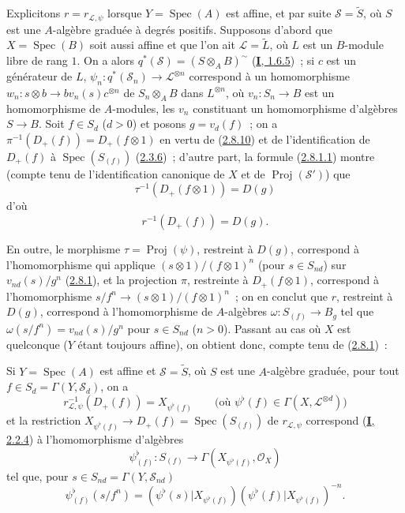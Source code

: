 \begin{env}[3.7.2]
\label{II.3.7.2-fr}
Explicitons $r=r_{\mathcal{L},\psi}$ lorsque $Y=\operatorname{Spec}(A)$ est
affine, et par suite $\mathcal{S}=\widetilde{S}$, où $S$ est une $A$-algèbre
graduée à degrés positifs. Supposons d'abord que $X=\operatorname{Spec}(B)$
soit aussi affine et que l'on ait $\mathcal{L}=\widetilde{L}$, où $L$ est un
$B$-module libre de rang $1$. On a alors
$q^*(\mathcal{S})=(S\otimes_AB)^{\sim}$
(\hyperref[I.1.6.5-fr]{\textbf{I}, 1.6.5})~; si $c$ est un générateur de $L$,
$\psi_n:q^*(\mathcal{S}_n)\to\mathcal{L}^{\otimes n}$ correspond à un
homomorphisme
$w_n:s\otimes b\to bv_n(s)c^{\otimes n}$ de $S_n\otimes_AB$ dans
$L^{\otimes n}$, où $v_n:S_n\to B$ est un homomorphisme de $A$-modules, les
$v_n$ constituant un homomorphisme d'algèbres $S\to B$. Soit $f\in S_d$
($d>0$) et posons $g=v_d(f)$~; on a
$\pi^{-1}(D_+(f))=D_+(f\otimes1)$ en vertu de
(\hyperref[II.2.8.10-fr]{2.8.10}) et de l'identification de $D_+(f)$ à
$\operatorname{Spec}(S_{(f)})$ (\hyperref[II.2.3.6-fr]{2.3.6})~; d'autre
part, la formule (\hyperref[II.2.8.1.1-fr]{2.8.1.1}) montre (compte tenu de
l'identification canonique de $X$ et de $\operatorname{Proj}(\mathcal{S}')$)
que
\[
  \tau^{-1}(D_+(f\otimes1))=D(g)
\]
d'où
\[
\label{II.3.7.2.1-fr}
  r^{-1}(D_+(f))=D(g).
\tag{3.7.2.1}
\]

En outre, le morphisme $\tau=\operatorname{Proj}(\psi)$, restreint à $D(g)$,
correspond à l'homomorphisme qui applique
$(s\otimes1)/(f\otimes1)^n$ (pour $s\in S_{nd}$) sur
$v_{nd}(s)/g^n$ (\hyperref[II.2.8.1-fr]{2.8.1}), et la projection $\pi$,
restreinte à $D_+(f\otimes1)$, correspond à l'homomorphisme
$s/f^n\to(s\otimes1)/(f\otimes1)^n$~; on en conclut que $r$, restreint à
$D(g)$, correspond à l'homomorphisme de $A$-algèbres
$\omega:S_{(f)}\to B_g$ tel que $\omega(s/f^n)=v_{nd}(s)/g^n$ pour
$s\in S_{nd}$ ($n>0$). Passant au cas où $X$ est quelconque ($Y$ étant
toujours affine), on obtient donc, compte tenu de
(\hyperref[II.2.8.1-fr]{2.8.1})~:
\end{env}

\begin{proposition}[3.7.3]
\label{II.3.7.3-fr}
Si $Y=\operatorname{Spec}(A)$ est affine et $\mathcal{S}=\widetilde{S}$, où
$S$ est une $A$-algèbre graduée, pour tout
$f\in S_d=\Gamma(Y,\mathcal{S}_d)$, on a
\[
\label{II.3.7.3.1-fr}
  r_{\mathcal{L},\psi}^{-1}(D_+(f))=X_{\psi^\flat(f)}
  \qquad\bigl(\text{où }\psi^\flat(f)\in
  \Gamma(X,\mathcal{L}^{\otimes d})\bigr)
\tag{3.7.3.1}
\]
et la restriction $X_{\psi^\flat(f)}\to D_+(f)=\operatorname{Spec}(S_{(f)})$
de $r_{\mathcal{L},\psi}$ correspond
\textup{(\hyperref[I.2.2.4-fr]{\textbf{I}, 2.2.4})} à l'homomorphisme d'algèbres
\[
\label{II.3.7.3.2-fr}
  \psi_{(f)}^\flat:S_{(f)}\longrightarrow
  \Gamma(X_{\psi^\flat(f)},\mathcal{O}_X)
\tag{3.7.3.2}
\]
tel que, pour $s\in S_{nd}=\Gamma(Y,\mathcal{S}_{nd})$
\[
\label{II.3.7.3.3-fr}
  \psi_{(f)}^\flat(s/f^n)
  =(\psi^\flat(s)|X_{\psi^\flat(f)})
   (\psi^\flat(f)|X_{\psi^\flat(f)})^{-n}.
\tag{3.7.3.3}
\]
\end{proposition}

